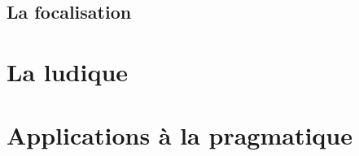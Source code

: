 \documentclass[12pt]{report}
\begin{document}
\section{La focalisation}

\chapter{La ludique}

\chapter{Applications à la pragmatique}

\nocite{Tai68}
\nocite{Lec11}
\nocite{Gir03}
\nocite{Gir06}



\end{document}
